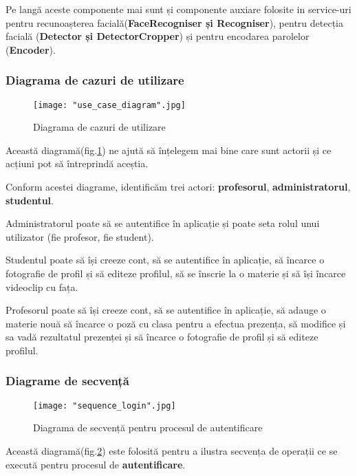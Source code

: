 \documentclass[a4paper, 12pt]{article}
\begin{document}
	Pe langă aceste componente mai sunt și componente auxiare folosite in service-uri pentru recunoașterea facială(\textbf{FaceRecogniser și Recogniser}), pentru detecția facială (\textbf{Detector și DetectorCropper}) și pentru encodarea parolelor (\textbf{Encoder}).
	
	\bigskip
	\subsubsection{Diagrama de cazuri de utilizare}
	\bigskip
	\begin{figure}[!htb]
		\centering
		\texttt{[image: "use\_case\_diagram".jpg]}
		\caption{Diagrama de cazuri de utilizare}\label{fig:use_case}
	\end{figure}
	
	\quad Această diagramă(fig.\ref{fig:use_case}) ne ajută să înțelegem mai bine care sunt actorii și ce acțiuni pot să întreprindă aceștia.
	
	\quad Conform acestei diagrame, identificăm trei actori: \textbf{profesorul}, \textbf{administratorul}, \textbf{studentul}.
	
	\quad Administratorul poate să se autentifice în aplicație și poate seta rolul unui utilizator (fie profesor, fie student).
	
	\quad Studentul poate să își creeze cont, să se autentifice în aplicație, să încarce o fotografie de profil și să editeze profilul, să se înscrie la o materie și să își încarce videoclip cu fața.
	
	\quad Profesorul poate să își creeze cont, să se autentifice în aplicație, să adauge o materie nouă să încarce o poză cu clasa pentru a efectua prezența, să modifice și sa vadă rezultatul prezenței și să încarce o fotografie de profil și să editeze profilul.
	
	
	\bigskip
	\subsubsection{Diagrame de secvență}
	\bigskip
	\begin{figure}[H]
		\centering
		\texttt{[image: "sequence\_login".jpg]}
		\caption{Diagrama de secvență pentru procesul de autentificare}\label{fig:sequence_login}
	\end{figure}
	
	\quad Această diagramă(fig.\ref{fig:sequence_login}) este folosită pentru a ilustra secvența de operații ce se execută pentru procesul de \textbf{autentificare}.
	
\end{document}
